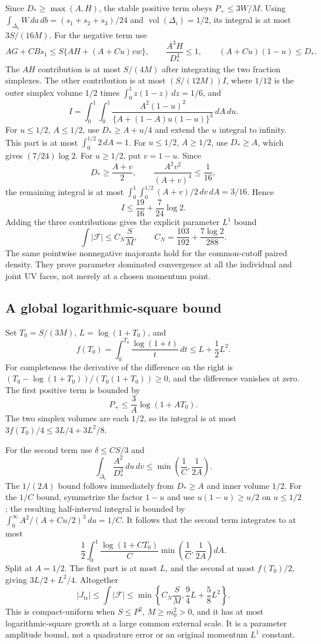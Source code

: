 Since $D_*\ge\max(A,H)$, the stable positive term obeys $P_+\le3W/M$.
Using
$\int_{\Delta_o}W\,da\,db=(s_1+s_2+s_3)/24$ and
$\operatorname{vol}(\Delta_i)=1/2$, its integral is at most
$3S/(16M)$. For the negative term use
\[
 AG+CBs_1\le S\{AH+(A+Cu)vw\},\qquad
 \frac{A^3H}{D_*^4}\le1,
 \qquad (A+Cu)(1-u)\le D_*.
\]
The $AH$ contribution is at most $S/(4M)$ after integrating the two
fraction simplexes. The other contribution is at most $(S/(12M))I$,
where $1/12$ is the outer simplex volume $1/2$ times
$\int_0^1z(1-z)\,dz=1/6$, and
\[
 I=\int_0^1\int_0^1
 \frac{A^2(1-u)^2}{\{A+(1-A)u(1-u)\}^3}\,dA\,du.
\]
For $u\le1/2$, $A\le1/2$, use $D_*\ge A+u/4$ and extend the
$u$ integral to infinity. This part is at most
$\int_0^{1/2}2\,dA=1$. For $u\le1/2$, $A\ge1/2$, use $D_*\ge A$,
which gives $(7/24)\log2$. For $u\ge1/2$, put $v=1-u$. Since
\[
 D_*\ge\frac{A+v}{2},\qquad
 \frac{A^2v^2}{(A+v)^4}\le\frac1{16},
\]
the remaining integral is at most
$\int_0^1\int_0^{1/2}(A+v)/2\,dv\,dA=3/16$. Hence
\[
 I\le\frac{19}{16}+\frac7{24}\log2.
\]
Adding the three contributions gives the explicit parameter $L^1$ bound
\[
 \int|\mathcal F|\le C_N\frac SM,\qquad
 C_N=\frac{103}{192}+\frac{7\log2}{288}.
\]
The same pointwise nonnegative majorants hold for the common-cutoff paired
density. They prove parameter dominated convergence at all the individual
and joint UV faces, not merely at a chosen momentum point.

\subsection{A global logarithmic-square bound}

Set $T_0=S/(3M)$, $L=\log(1+T_0)$, and
\[
 f(T_0)=\int_0^{T_0}\frac{\log(1+t)}{t}\,dt
            \le L+\frac12L^2.
\]
For completeness the derivative of the difference on the right is
$(T_0-\log(1+T_0))/(T_0(1+T_0))\ge0$, and the difference vanishes at zero.
The first positive term is bounded by
\[
 P_+\le\frac3A\log(1+AT_0).
\]
The two simplex volumes are each $1/2$, so its integral is at most
$3f(T_0)/4\le3L/4+3L^2/8$.

For the second term use $\delta\le CS/3$ and
\[
 \int_{\Delta_i}\frac{A^2}{D_*^3}\,du\,dv
       \le\min\left(\frac1C,\frac1{2A}\right).
\]
The $1/(2A)$ bound follows immediately from $D_*\ge A$ and inner volume
$1/2$. For the $1/C$ bound, symmetrize the factor $1-u$ and use
$u(1-u)\ge u/2$ on $u\le1/2$; the resulting half-interval integral is
bounded by $\int_0^\infty A^2/(A+Cu/2)^3\,du=1/C$.
It follows that the second term integrates to at most
\[
 \frac12\int_0^1\frac{\log(1+CT_0)}C
                \min\left(\frac1C,\frac1{2A}\right)dA.
\]
Split at $A=1/2$. The first part is at most $L$, and the second at most
$f(T_0)/2$, giving $3L/2+L^2/4$. Altogether
\[
 |J_{\mathrm{tr}}|\le\int|\mathcal F|
 \le\min\left\{C_N\frac SM,\frac94L+\frac58L^2\right\}.
\]
This is compact-uniform when $S\le P^2$, $M\ge m_0^2>0$, and it has
at most logarithmic-square growth at a large common external scale. It is
a parameter amplitude bound, not a quadrature error or an original
momentum $L^1$ constant.

